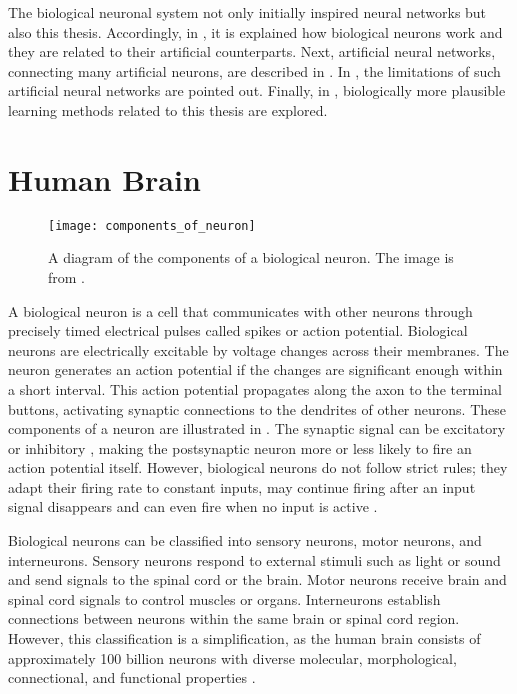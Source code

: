 The biological neuronal system not only initially inspired neural networks but also this thesis.
Accordingly, in , it is explained how biological neurons work and they are related to their artificial counterparts.
Next, artificial neural networks, connecting many artificial neurons, are described in .
In , the limitations of such artificial neural networks are pointed out.
Finally, in , biologically more plausible learning methods related to this thesis are explored.

\section{Human Brain}
\begin{figure}[h]
    \centering
    \texttt{[image: components\_of\_neuron]}
    \caption[Diagram of the components of a biological neuron]{A diagram of the components of a biological neuron. The image is from .}
\end{figure}

A biological neuron is a cell that communicates with other neurons through precisely timed electrical pulses called spikes or action potential.
Biological neurons are electrically excitable by voltage changes across their membranes.
The neuron generates an action potential if the changes are significant enough within a short interval.
This action potential propagates along the axon to the terminal buttons, activating synaptic connections to the dendrites of other neurons.
These components of a neuron are illustrated in .
The synaptic signal can be excitatory  or inhibitory , making the postsynaptic neuron more or less likely to fire an action potential itself.
However, biological neurons do not follow strict rules; they adapt their firing rate to constant inputs, may continue firing after an input signal disappears and can even fire when no input is active .

Biological neurons can be classified into sensory neurons, motor neurons, and interneurons.
Sensory neurons respond to external stimuli such as light or sound and send signals to the spinal cord or the brain.
Motor neurons receive brain and spinal cord signals to control muscles or organs.
Interneurons establish connections between neurons within the same brain or spinal cord region.
However, this classification is a simplification, as the human brain consists of approximately 100 billion neurons  with diverse molecular, morphological, connectional, and functional properties .

